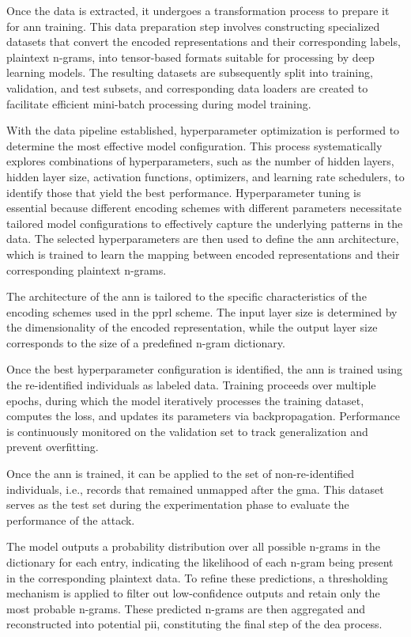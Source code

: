 Once the data is extracted, it undergoes a transformation process to prepare it for \ac{ann} training.
This data preparation step involves constructing specialized datasets that convert the encoded representations and their corresponding labels, plaintext n-grams, into tensor-based formats suitable for processing by deep learning models.
The resulting datasets are subsequently split into training, validation, and test subsets, and corresponding data loaders are created to facilitate efficient mini-batch processing during model training.

With the data pipeline established, hyperparameter optimization is performed to determine the most effective model configuration.
This process systematically explores combinations of hyperparameters, such as the number of hidden layers, hidden layer size, activation functions, optimizers, and learning rate schedulers, to identify those that yield the best performance.
Hyperparameter tuning is essential because different encoding schemes with different parameters necessitate tailored model configurations to effectively capture the underlying patterns in the data.
The selected hyperparameters are then used to define the \ac{ann} architecture, which is trained to learn the mapping between encoded representations and their corresponding plaintext n-grams.


The architecture of the \ac{ann} is tailored to the specific characteristics of the encoding schemes used in the \ac{pprl} scheme.
The input layer size is determined by the dimensionality of the encoded representation, while the output layer size corresponds to the size of a predefined n-gram dictionary.

Once the best hyperparameter configuration is identified, the \ac{ann} is trained using the re-identified individuals as labeled data.
Training proceeds over multiple epochs, during which the model iteratively processes the training dataset, computes the loss, and updates its parameters via backpropagation.
Performance is continuously monitored on the validation set to track generalization and prevent overfitting.

Once the \ac{ann} is trained, it can be applied to the set of non-re-identified individuals, i.e., records that remained unmapped after the \ac{gma}.
This dataset serves as the test set during the experimentation phase to evaluate the performance of the attack.

The model outputs a probability distribution over all possible n-grams in the dictionary for each entry, indicating the likelihood of each n-gram being present in the corresponding plaintext data.
To refine these predictions, a thresholding mechanism is applied to filter out low-confidence outputs and retain only the most probable n-grams.
These predicted n-grams are then aggregated and reconstructed into potential \ac{pii}, constituting the final step of the \ac{dea} process.

